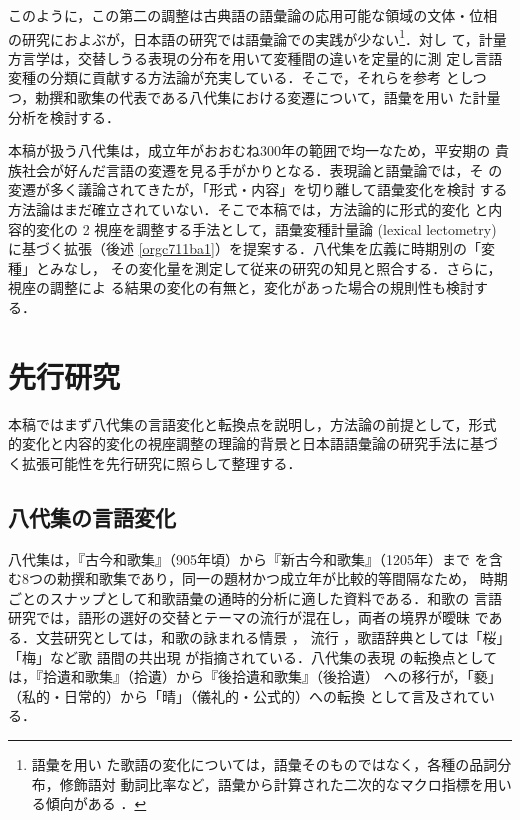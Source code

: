 \documentclass[submit]{ipsj}
\renewcommand{\ref}{\cref}
\begin{document}
このように，この第二の調整は古典語の語彙論の応用可能な領域の文体・位相
の研究におよぶが，日本語の研究では語彙論での実践が少ない\footnote{語彙を用い
た歌語の変化については，語彙そのものではなく，各種の品詞分布，修飾語対
動詞比率など，語彙から計算された二次的なマクロ指標を用いる傾向がある
\cite{tsuji1998Uta,nishihata1992Waka,hatano1941Waka}．}．対し
て，計量方言学は，交替しうる表現の分布を用いて変種間の違いを定量的に測
定し言語変種の分類に貢献する方法論が充実している．そこで，それらを参考
としつつ，勅撰和歌集の代表である八代集における変遷について，語彙を用い
た計量分析を検討する．

本稿が扱う八代集は，成立年がおおむね300年の範囲で均一なため，平安期の
貴族社会が好んだ言語の変遷を見る手がかりとなる．表現論と語彙論では，そ
の変遷が多く議論されてきたが，「形式・内容」を切り離して語彙変化を検討
する方法論はまだ確立されていない．そこで本稿では，方法論的に形式的変化
と内容的変化の 2 視座を調整する手法として，語彙変種計量論 (lexical
lectometry) \cite{Speelman2003Profilebased} に基づく拡張（後述
\ref{orgc711ba1}）を提案する．八代集を広義に時期別の「変種」とみなし，
その変化量を測定して従来の研究の知見と照合する．さらに，視座の調整によ
る結果の変化の有無と，変化があった場合の規則性も検討する．
\section{先行研究\label{org20d127e}}
\label{sec:org68d7560}
本稿ではまず八代集の言語変化と転換点を説明し，方法論の前提として，形式
的変化と内容的変化の視座調整の理論的背景と日本語語彙論の研究手法に基づ
く拡張可能性を先行研究に照らして整理する．
\subsection{八代集の言語変化\label{org0f9f35a}}
\label{sec:orgfe6b9ee}
八代集は，『古今和歌集』（905年頃）から『新古今和歌集』（1205年）まで
を含む8つの勅撰和歌集であり，同一の題材かつ成立年が比較的等間隔なため，
時期ごとのスナップとして和歌語彙の通時的分析に適した資料である．和歌の
言語研究では，語形の選好の交替とテーマの流行が混在し，両者の境界が曖昧
である．文芸研究としては，和歌の詠まれる情景 \cite{ueno1976Koshui}，
流行 \cite{kawamura1991Sekkan}，歌語辞典としては「桜」「梅」など歌
語間の共出現 \cite{katagiri1983Uta} が指摘されている．八代集の表現
の転換点としては，『拾遺和歌集』（拾遺）から『後拾遺和歌集』（後拾遺）
への移行が，「褻」（私的・日常的）から「晴」（儀礼的・公式的）への転換
として言及されている\cite{ueno1976Koshui,kawamura1991Sekkan}．
\end{document}
